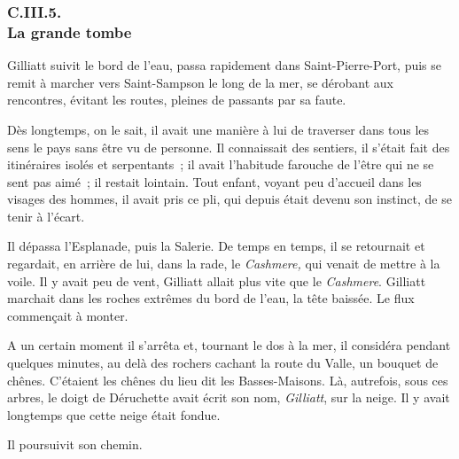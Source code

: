 \documentclass[french,twoside]{book} %
\begin{document}
 \subsubsection[{C.III.5. La grande tombe}]{C.III.5. \\
La grande tombe}
\noindent Gilliatt suivit le bord de l’eau, passa rapidement dans Saint-Pierre-Port, puis se remit à marcher vers Saint-Sampson le long de la mer, se dérobant aux rencontres, évitant les routes, pleines de passants par sa faute.\par
Dès longtemps, on le sait, il avait une manière à lui de traverser dans tous les sens le pays sans être vu de personne. Il connaissait des sentiers, il s’était fait des itinéraires isolés et serpentants ; il avait l’habitude farouche de l’être qui ne se sent pas aimé ; il restait lointain. Tout enfant, voyant peu d’accueil dans les visages des hommes, il avait pris ce pli, qui depuis était devenu son instinct, de se tenir à l’écart.\par
Il dépassa l’Esplanade, puis la Salerie. De temps en temps, il se retournait et regardait, en arrière de lui, dans la rade, le \emph{Cashmere,} qui venait de mettre à la voile. Il y avait peu de vent, Gilliatt allait plus vite que le \emph{Cashmere}. Gilliatt marchait dans les roches extrêmes  du bord de l’eau, la tête baissée. Le flux commençait à monter.\par
A un certain moment il s’arrêta et, tournant le dos à la mer, il considéra pendant quelques minutes, au delà des rochers cachant la route du Valle, un bouquet de chênes. C’étaient les chênes du lieu dit les Basses-Maisons. Là, autrefois, sous ces arbres, le doigt de Déruchette avait écrit son nom, \emph{Gilliatt}, sur la neige. Il y avait longtemps que cette neige était fondue.\par
Il poursuivit son chemin.\par
\end{document}
